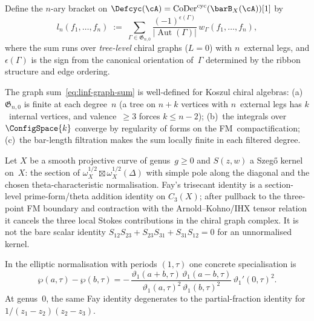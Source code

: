 \begin{construction}\label{constr:linf-from-graphs}
Define the $n$-ary bracket on
$\Defcyc(\cA) = \operatorname{CoDer}^{\mathrm{cyc}}(\barB_X(\cA))[1]$
by
\begin{equation}\label{eq:linf-graph-sum}
l_n(f_1, \ldots, f_n)
\;:=\;
\sum_{\Gamma \in \mathfrak{G}_{n,0}}
\frac{(-1)^{\epsilon(\Gamma)}}
{\lvert\operatorname{Aut}(\Gamma)\rvert}
\, w_\Gamma(f_1, \ldots, f_n),
\end{equation}
where the sum runs over \emph{tree-level} chiral graphs ($L = 0$) with
$n$~external legs, and $\epsilon(\Gamma)$ is the sign from the
canonical orientation of~$\Gamma$ determined by the ribbon structure
and edge ordering.
\end{construction}

The graph sum~\eqref{eq:linf-graph-sum} is well-defined for Koszul
chiral algebras:
(a)~$\mathfrak{G}_{n,0}$ is finite at each degree~$n$ (a tree on $n + k$ vertices with $n$~external legs has
$k$~internal vertices, and valence~$\geq 3$ forces
$k \leq n - 2$);
(b)~the integrals over~$\ConfigSpace{k}$ converge by
regularity of forms on the FM~compactification;
(c)~the bar-length filtration makes the sum locally finite in each
filtered degree.

\begin{proposition}\label{prop:fay-trisecant}
Let $X$ be a smooth projective curve of genus~$g \geq 0$ and
$S(z,w)$ a Szeg\H{o} kernel on~$X$: the section of
$\omega_X^{1/2} \boxtimes \omega_X^{1/2}(\Delta)$ with simple pole
along the diagonal and the chosen theta-characteristic
normalisation. Fay's trisecant identity is a section-level
prime-form/theta addition identity on $C_3(X)$; after pullback to
the three-point FM boundary and contraction with the
Arnold--Kohno/IHX tensor relation it cancels the three local
Stokes contributions in the chiral graph complex. It is not the
bare scalar identity
$S_{12}S_{23}+S_{23}S_{31}+S_{31}S_{12}=0$ for an unnormalised
kernel.

In the elliptic normalisation with periods $(1,\tau)$ one concrete
specialisation is
\begin{equation}\label{eq:algebraic-fay}
 \wp(a,\tau)-\wp(b,\tau)
 =
 -\,\frac{
 \vartheta_1(a+b,\tau)\,\vartheta_1(a-b,\tau)}
 {\vartheta_1(a,\tau)^2\,\vartheta_1(b,\tau)^2}
 \,\vartheta_1'(0,\tau)^2 .
\end{equation}
At genus~$0$, the same Fay identity degenerates to the
partial-fraction identity for $1/(z_1-z_2)(z_2-z_3)$.
\end{proposition}

